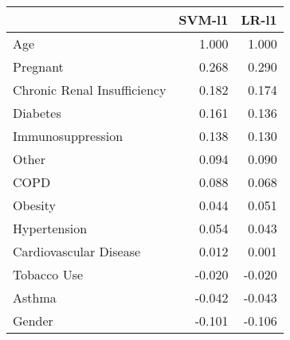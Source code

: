 \begin{tabular}{lrr}
\toprule
{} &  SVM-l1 &  LR-l1 \\
\midrule
Age                         &   1.000 &  1.000 \\
Pregnant                    &   0.268 &  0.290 \\
Chronic Renal Insufficiency &   0.182 &  0.174 \\
Diabetes                    &   0.161 &  0.136 \\
Immunosuppression           &   0.138 &  0.130 \\
Other                       &   0.094 &  0.090 \\
COPD                        &   0.088 &  0.068 \\
Obesity                     &   0.044 &  0.051 \\
Hypertension                &   0.054 &  0.043 \\
Cardiovascular Disease      &   0.012 &  0.001 \\
Tobacco Use                 &  -0.020 & -0.020 \\
Asthma                      &  -0.042 & -0.043 \\
Gender                      &  -0.101 & -0.106 \\
\bottomrule
\end{tabular}
